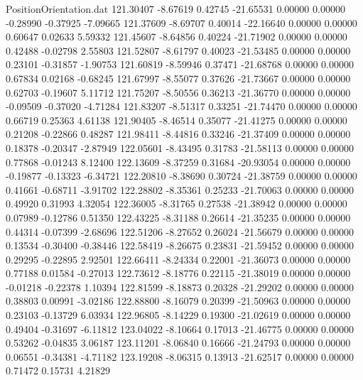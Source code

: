 \begin{filecontents}{PositionOrientation.dat}
 121.30407   -8.67619    0.42745   -21.65531    0.00000    0.00000   -0.28990   -0.37925   -7.09665
 121.37609   -8.69707    0.40014   -22.16640    0.00000    0.00000    0.60647    0.02633    5.59332
 121.45607   -8.64856    0.40224   -21.71902    0.00000    0.00000    0.42488   -0.02798    2.55803
 121.52807   -8.61797    0.40023   -21.53485    0.00000    0.00000    0.23101   -0.31857   -1.90753
 121.60819   -8.59946    0.37471   -21.68768    0.00000    0.00000    0.67834    0.02168   -0.68245
 121.67997   -8.55077    0.37626   -21.73667    0.00000    0.00000    0.62703   -0.19607    5.11712
 121.75207   -8.50556    0.36213   -21.36770    0.00000    0.00000   -0.09509   -0.37020   -4.71284
 121.83207   -8.51317    0.33251   -21.74470    0.00000    0.00000    0.66719    0.25363    4.61138
 121.90405   -8.46514    0.35077   -21.41275    0.00000    0.00000    0.21208   -0.22866    0.48287
 121.98411   -8.44816    0.33246   -21.37409    0.00000    0.00000    0.18378   -0.20347   -2.87949
 122.05601   -8.43495    0.31783   -21.58113    0.00000    0.00000    0.77868   -0.01243    8.12400
 122.13609   -8.37259    0.31684   -20.93054    0.00000    0.00000   -0.19877   -0.13323   -6.34721
 122.20810   -8.38690    0.30724   -21.38759    0.00000    0.00000    0.41661   -0.68711   -3.91702
 122.28802   -8.35361    0.25233   -21.70063    0.00000    0.00000    0.49920    0.31993    4.32054
 122.36005   -8.31765    0.27538   -21.38942    0.00000    0.00000    0.07989   -0.12786    0.51350
 122.43225   -8.31188    0.26614   -21.35235    0.00000    0.00000    0.44314   -0.07399   -2.68696
 122.51206   -8.27652    0.26024   -21.56679    0.00000    0.00000    0.13534   -0.30400   -0.38446
 122.58419   -8.26675    0.23831   -21.59452    0.00000    0.00000    0.29295   -0.22895    2.92501
 122.66411   -8.24334    0.22001   -21.36073    0.00000    0.00000    0.77188    0.01584   -0.27013
 122.73612   -8.18776    0.22115   -21.38019    0.00000    0.00000   -0.01218   -0.22378    1.10394
 122.81599   -8.18873    0.20328   -21.29202    0.00000    0.00000    0.38803    0.00991   -3.02186
 122.88800   -8.16079    0.20399   -21.50963    0.00000    0.00000    0.23103   -0.13729    6.03934
 122.96805   -8.14229    0.19300   -21.02619    0.00000    0.00000    0.49404   -0.31697   -6.11812
 123.04022   -8.10664    0.17013   -21.46775    0.00000    0.00000    0.53262   -0.04835    3.06187
 123.11201   -8.06840    0.16666   -21.24793    0.00000    0.00000    0.06551   -0.34381   -4.71182
 123.19208   -8.06315    0.13913   -21.62517    0.00000    0.00000    0.71472    0.15731    4.21829

\end{filecontents}
